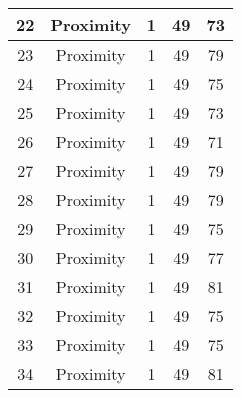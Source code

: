 \documentclass[results.tex]{subfiles}
\begin{document}
\begin{center}
\begin{tabular}{| c || c | c | c | c |}
            \hline
            22                      & Proximity                    & 1                      & 49                      & 73                   \\
            \hline
            23                      & Proximity                    & 1                      & 49                      & 79                   \\
            \hline
            24                      & Proximity                    & 1                      & 49                      & 75                   \\
            \hline
            25                      & Proximity                    & 1                      & 49                      & 73                   \\
            \hline
            26                      & Proximity                    & 1                      & 49                      & 71                   \\
            \hline
            27                      & Proximity                    & 1                      & 49                      & 79                   \\
            \hline
            28                      & Proximity                    & 1                      & 49                      & 79                   \\
            \hline
            29                      & Proximity                    & 1                      & 49                      & 75                   \\
            \hline
            30                      & Proximity                    & 1                      & 49                      & 77                   \\
            \hline
            31                      & Proximity                    & 1                      & 49                      & 81                   \\
            \hline
            32                      & Proximity                    & 1                      & 49                      & 75                   \\
            \hline
            33                      & Proximity                    & 1                      & 49                      & 75                   \\
            \hline
            34                      & Proximity                    & 1                      & 49                      & 81                   \\

\end{tabular}
\end{center}
\end{document}
